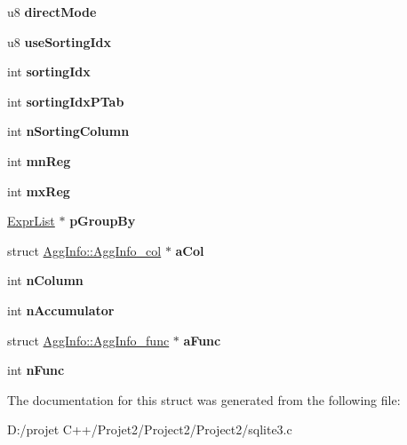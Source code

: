 \begin{DoxyCompactItemize}
\item 
\mbox{\label{struct_agg_info_aaa57d294016ac7e17e7cacaa7b25634e}} 
u8 {\bfseries direct\+Mode}
\item 
\mbox{\label{struct_agg_info_a8173a7ea13c4a12ce4befbcb40719073}} 
u8 {\bfseries use\+Sorting\+Idx}
\item 
\mbox{\label{struct_agg_info_a97ce74f509ca908a616c123e7196797b}} 
int {\bfseries sorting\+Idx}
\item 
\mbox{\label{struct_agg_info_a7faac4c3996598960fc46f0c173b244c}} 
int {\bfseries sorting\+Idx\+P\+Tab}
\item 
\mbox{\label{struct_agg_info_a89925dccd1a0ec51d2a5a5dbaead66dc}} 
int {\bfseries n\+Sorting\+Column}
\item 
\mbox{\label{struct_agg_info_aa9a656c3db8fe0f2905062bbcc55efdc}} 
int {\bfseries mn\+Reg}
\item 
\mbox{\label{struct_agg_info_a7aec99396ee3da0bdd985685de1b9da2}} 
int {\bfseries mx\+Reg}
\item 
\mbox{\label{struct_agg_info_aa8e942103d224c4db847743670907781}} 
\mbox{\hyperlink{struct_expr_list}{Expr\+List}} $\ast$ {\bfseries p\+Group\+By}
\item 
\mbox{\label{struct_agg_info_a52fa1a7eb3145c27be13b2bcccd57d62}} 
struct \mbox{\hyperlink{struct_agg_info_1_1_agg_info__col}{Agg\+Info\+::\+Agg\+Info\+\_\+col}} $\ast$ {\bfseries a\+Col}
\item 
\mbox{\label{struct_agg_info_a9cbfa5fc33328cf3500426674e036a8b}} 
int {\bfseries n\+Column}
\item 
\mbox{\label{struct_agg_info_ad2251760d95af9024f0a3170405cb53b}} 
int {\bfseries n\+Accumulator}
\item 
\mbox{\label{struct_agg_info_a4e201acd6a1f8aed360c58e45f47c803}} 
struct \mbox{\hyperlink{struct_agg_info_1_1_agg_info__func}{Agg\+Info\+::\+Agg\+Info\+\_\+func}} $\ast$ {\bfseries a\+Func}
\item 
\mbox{\label{struct_agg_info_a5bfde7ca00d28da6edbda523ab038e38}} 
int {\bfseries n\+Func}
\end{DoxyCompactItemize}


The documentation for this struct was generated from the following file\+:\begin{DoxyCompactItemize}
\item 
D\+:/projet C++/\+Projet2/\+Project2/\+Project2/sqlite3.\+c\end{DoxyCompactItemize}
